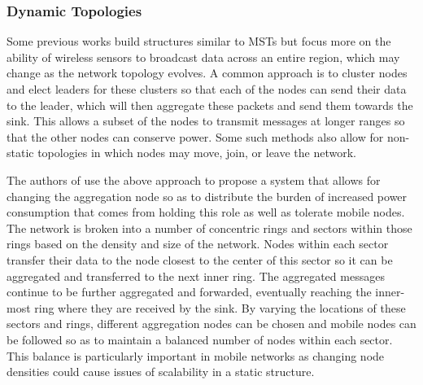\documentclass{IEEEtran}
\begin{document}
\subsubsection{Dynamic Topologies}

Some previous works build structures similar to MSTs but focus more on the ability of wireless sensors to broadcast data across an entire region, which may change as the network topology evolves.
A common approach is to cluster nodes and elect leaders for these clusters so that each of the nodes can send their data to the leader, which will then aggregate these packets and send them towards the sink.  This allows a subset of the nodes to transmit messages at longer ranges so that the other nodes can conserve power.  Some such methods also allow for non-static topologies in which nodes may move, join, or leave the network.

The authors of \cite{sct} use the above approach to propose a system that allows for changing the aggregation node so as to distribute the burden of increased power consumption that comes from holding this role as well as tolerate mobile nodes.  The network is broken into a number of concentric rings and sectors within those rings based on the density and size of the network.
Nodes within each sector transfer their data to the node closest to the center of this sector so it can be aggregated and transferred to the next inner ring. The aggregated messages continue to be further aggregated and forwarded, eventually reaching the inner-most ring where they are received by the sink.
By varying the locations of these sectors and rings, different aggregation nodes can be chosen and mobile nodes can be followed so as to maintain a balanced number of nodes within each sector.  This balance is particularly important in mobile networks as changing node densities could cause issues of scalability in a static structure.
\end{document}
